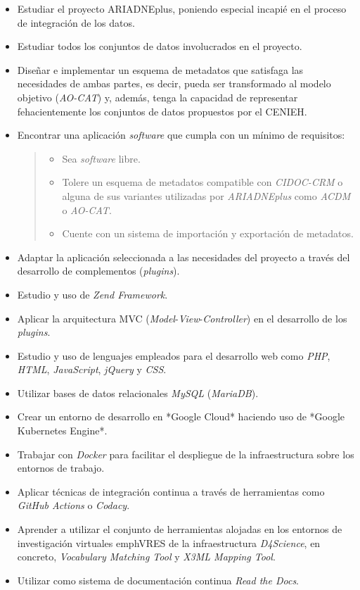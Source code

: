 \begin{itemize}
\tightlist
\item
  Estudiar el proyecto ARIADNEplus, poniendo especial incapié en el
  proceso de integración de los datos.
\item
  Estudiar todos los conjuntos de datos involucrados en el proyecto.
\item
  Diseñar e implementar un esquema de metadatos que satisfaga las
  necesidades de ambas partes, es decir, pueda ser transformado al
  modelo objetivo (\emph{AO-CAT}) y, además, tenga la capacidad de
  representar fehacientemente los conjuntos de datos propuestos por el
  CENIEH.
\item
  Encontrar una aplicación \emph{software} que cumpla con un mínimo de
  requisitos:

  \begin{quote}
  \begin{itemize}
  \tightlist
  \item
    Sea \emph{software} libre.
  \item
    Tolere un esquema de metadatos compatible con \emph{CIDOC-CRM} o
    alguna de sus variantes utilizadas por \emph{ARIADNEplus} como \emph{ACDM}
    o \emph{AO-CAT}.
  \item
    Cuente con un sistema de importación y exportación de metadatos.
  \end{itemize}
  \end{quote}
\item
  Adaptar la aplicación seleccionada a las necesidades del proyecto a
  través del desarrollo de complementos (\emph{plugins}).
\item
  Estudio y uso de \emph{Zend Framework}.
\item
  Aplicar la arquitectura MVC
  (\emph{Model}-\emph{View}-\emph{Controller}) en el desarrollo de los
  \emph{plugins}.
\item
  Estudio y uso de lenguajes empleados para el desarrollo web como
  \emph{PHP}, \emph{HTML}, \emph{JavaScript}, \emph{jQuery} y
  \emph{CSS}.
\item
  Utilizar bases de datos relacionales \emph{MySQL} (\emph{MariaDB}).
\item
  Crear un entorno de desarrollo en *Google Cloud* haciendo uso de *Google Kubernetes Engine*.
\item
  Trabajar con \emph{Docker} para facilitar el despliegue de la
  infraestructura sobre los entornos de trabajo.
\item
  Aplicar técnicas de integración continua a través de herramientas como
  \emph{GitHub Actions} o \emph{Codacy}.
\item
  Aprender a utilizar el conjunto de herramientas alojadas en los entornos de investigación
  virtuales emph{VRES} de la infraestructura \emph{D4Science}, en concreto, \emph{Vocabulary
  Matching Tool} y \emph{X3ML Mapping Tool}.
\item
  Utilizar como sistema de documentación continua \emph{Read the Docs}.
\end{itemize}

